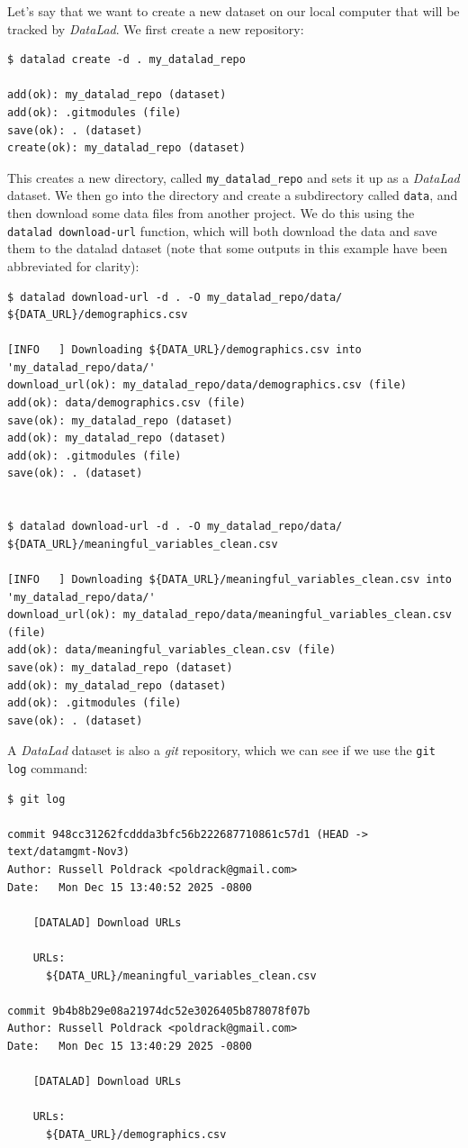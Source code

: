 Let's say that we want to create a new dataset on our local computer that will be tracked by \textit{DataLad}.  We first create a new repository:

\begin{lstlisting}[style=shell]
$ datalad create -d . my_datalad_repo

add(ok): my_datalad_repo (dataset)
add(ok): .gitmodules (file)
save(ok): . (dataset)
create(ok): my_datalad_repo (dataset)
\end{lstlisting}

This creates a new directory, called \texttt{my\_datalad\_repo} and sets it up as a \textit{DataLad} dataset.  We then go into the directory and create a subdirectory called \texttt{data}, and then download some data files from another project.  We do this using the \texttt{datalad download-url} function, which will both download the data and save them to the datalad dataset (note that some outputs in this example have been abbreviated for clarity):

\begin{lstlisting}[style=shell]
$ datalad download-url -d . -O my_datalad_repo/data/ ${DATA_URL}/demographics.csv

[INFO   ] Downloading ${DATA_URL}/demographics.csv into 'my_datalad_repo/data/'
download_url(ok): my_datalad_repo/data/demographics.csv (file)
add(ok): data/demographics.csv (file)
save(ok): my_datalad_repo (dataset)
add(ok): my_datalad_repo (dataset)
add(ok): .gitmodules (file)
save(ok): . (dataset)


$ datalad download-url -d . -O my_datalad_repo/data/ ${DATA_URL}/meaningful_variables_clean.csv

[INFO   ] Downloading ${DATA_URL}/meaningful_variables_clean.csv into 'my_datalad_repo/data/'
download_url(ok): my_datalad_repo/data/meaningful_variables_clean.csv (file)
add(ok): data/meaningful_variables_clean.csv (file)
save(ok): my_datalad_repo (dataset)
add(ok): my_datalad_repo (dataset)
add(ok): .gitmodules (file)
save(ok): . (dataset)
\end{lstlisting}

A \textit{DataLad} dataset is also a \textit{git} repository, which we can see if we use the \texttt{git log} command:

\begin{lstlisting}[style=shell]
$ git log

commit 948cc31262fcddda3bfc56b222687710861c57d1 (HEAD -> text/datamgmt-Nov3)
Author: Russell Poldrack <poldrack@gmail.com>
Date:   Mon Dec 15 13:40:52 2025 -0800

    [DATALAD] Download URLs

    URLs:
      ${DATA_URL}/meaningful_variables_clean.csv

commit 9b4b8b29e08a21974dc52e3026405b878078f07b
Author: Russell Poldrack <poldrack@gmail.com>
Date:   Mon Dec 15 13:40:29 2025 -0800

    [DATALAD] Download URLs

    URLs:
      ${DATA_URL}/demographics.csv
\end{lstlisting}

